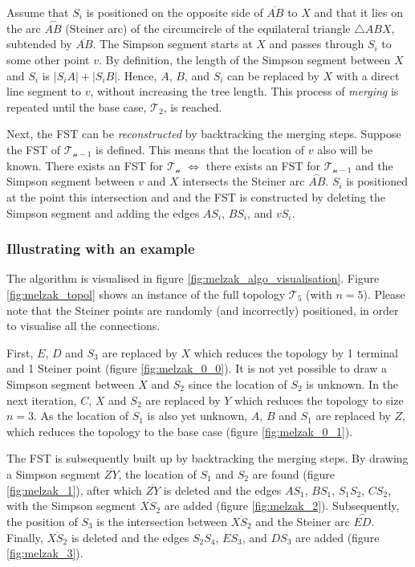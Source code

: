 \documentclass{l4proj}
\newcommand{\arc}[1]{\stackrel{\frown}{#1}}
\begin{document}
Assume that $S_i$ is positioned on the opposite side of $\overline{AB}$ to $X$ and that it lies on the arc $\arc{AB}$ (Steiner arc) of the circumcircle of the equilateral triangle $\triangle ABX$, subtended by $\overline{AB}$.
The Simpson segment starts at $X$ and passes through $S_i$ to some other point $v$. By definition, the length of the Simpson segment between $X$ and $S_i$ is $|S_iA| + |S_iB|$. Hence, $A$, $B$, and $S_i$ can be replaced by $X$ with a direct line segment to $v$, without increasing the tree length.
This process of \textit{merging} is repeated until the base case, $\mathcal{T_2}$, is reached.

Next, the FST can be \textit{reconstructed} by backtracking the merging steps.
Suppose the FST of $\mathcal{T_{n-1}}$ is defined. This means that the location of $v$ also will be known.
There exists an FST for $\mathcal{T_n}$ $\iff$ there exists an FST for $\mathcal{T_{n-1}}$ and the Simpson segment between $v$ and $X$ intersects the Steiner arc $\arc{AB}$. $S_i$ is positioned at the point this intersection and and the FST is constructed by deleting the Simpson segment and adding the edges $AS_i$, $BS_i$, and $vS_i$.

\subsubsection{Illustrating with an example}
The algorithm is visualised in figure \ref{fig:melzak_algo_visualisation}.
Figure \ref{fig:melzak_topol} shows an instance of the full topology $\mathcal{T_5}$ (with $n = 5$). Please note that the Steiner points are randomly (and incorrectly) positioned, in order to visualise all the connections.

First, $E$, $D$ and $S_3$ are replaced by $X$ which reduces the topology by 1 terminal and 1 Steiner point (figure \ref{fig:melzak_0_0}). It is not yet possible to draw a Simpson segment between $X$ and $S_2$ since the location of $S_2$ is unknown.
In the next iteration, $C$, $X$ and $S_2$ are replaced by $Y$ which reduces the topology to size $n = 3$. As the location of $S_1$ is also yet unknown, $A$, $B$ and $S_1$ are replaced by $Z$, which reduces the topology to the base case (figure \ref{fig:melzak_0_1}).

The FST is subsequently built up by backtracking the merging steps. By drawing a Simpson segment $\overline{ZY}$, the location of $S_1$ and $S_2$ are found (figure \ref{fig:melzak_1}), after which $\overline{ZY}$ is deleted and the edges $AS_1$, $BS_1$, $S_1S_2$, $CS_2$, with the Simpson segment $\overline{XS_2}$ are added (figure \ref{fig:melzak_2}).
Subsequently, the position of $S_3$ is the intersection between $\overline{XS_2}$ and the Steiner arc $\arc{ED}$. Finally, $\overline{XS_2}$ is deleted and the edges $S_2S_4$, $ES_3$, and $DS_3$ are added (figure \ref{fig:melzak_3}).
\end{document}
